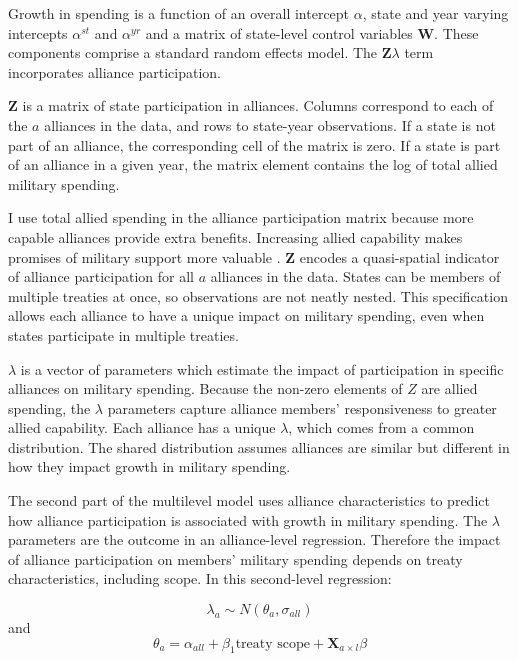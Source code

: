 \documentclass[12pt]{article}
\begin{document}
Growth in spending is a function of an overall intercept $\alpha$, state and year varying intercepts $\alpha^{st}$ and $\alpha^{yr}$ and a matrix of state-level control variables $\textbf{W}$.
These components comprise a standard random effects model. 
The $\textbf{Z} \lambda$ term incorporates alliance participation.


$\textbf{Z}$ is a matrix of state participation in alliances. 
Columns correspond to each of the $a$ alliances in the data, and rows to state-year observations. 
If a state is not part of an alliance, the corresponding cell of the matrix is zero.
If a state is part of an alliance in a given year, the matrix element contains the log of total allied military spending.


I use total allied spending in the alliance participation matrix because more capable alliances provide extra benefits.
Increasing allied capability makes promises of military support more valuable \citep{Johnsonetal2015}.  
$\textbf{Z}$ encodes a quasi-spatial indicator of alliance participation for all $a$ alliances in the data. 
States can be members of multiple treaties at once, so observations are not neatly nested. 
This specification allows each alliance to have a unique impact on military spending, even when states participate in multiple treaties. 


$\lambda$ is a vector of parameters which estimate the impact of participation in specific alliances on military spending. 
Because the non-zero elements of $Z$ are allied spending, the $\lambda$ parameters capture alliance members' responsiveness to greater allied capability. 
Each alliance has a unique $\lambda$, which comes from a common distribution. 
The shared distribution assumes alliances are similar but different in how they impact growth in military spending. 


The second part of the multilevel model uses alliance characteristics to predict how alliance participation is associated with growth in military spending. 
The $\lambda$ parameters are the outcome in an alliance-level regression.
Therefore the impact of alliance participation on members' military spending depends on treaty characteristics, including scope. 
In this second-level regression: 

\begin{equation}
\lambda_{a} \sim N(\theta_{a}, \sigma_{all})
\end{equation} 
and 
\begin{equation}
\theta_{a} = \alpha_{all} + \beta_1 \mbox{treaty scope} + \textbf{X}_{a \times l} \beta
\end{equation}
\end{document}
